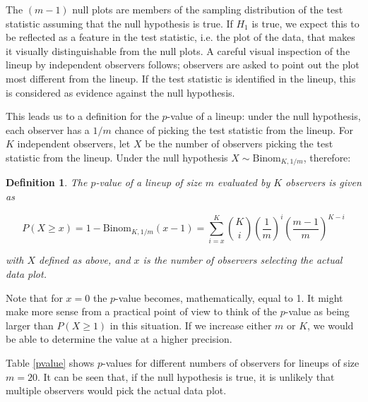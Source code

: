 \documentclass[12pt]{article}
\newtheorem{dfn}{Definition}[section]
\begin{document}
\noindent The $(m-1)$ null plots are %
members of the sampling distribution of the test statistic assuming that the null hypothesis is true. If $H_1$ is true, we expect this to be reflected as a feature in the test statistic, i.e. the plot of the data, that makes it visually distinguishable from the null plots. A careful visual inspection of the lineup by %
independent observers follows;  observers are asked to point out the plot most different from the lineup. If the test statistic is identified in the lineup, this is considered as evidence against the null hypothesis. 

This leads us to a definition for the $p$-value of a lineup: under the null hypothesis, each observer has a $1/m$ chance of picking the test statistic from the lineup.  For $K$ independent observers, let $X$ be  the number of observers picking the test statistic from the lineup. Under the null hypothesis $X \sim \text{Binom}_{K, 1/m}$,  therefore: 

\begin{dfn}\label{dfn:pvalue}
The $p$-value of a lineup of size $m$ evaluated by $K$ observers is  given as 

\begin{equation}\label{binom}
P(X \ge x) = 1 - \text{Binom}_{{K, 1/m}} (x-1) = \sum_{i=x}^{K} {K \choose i} \left(\frac{1}{m}\right)^{i} \left(\frac{m-1}{m}\right)^{K-i}
\end{equation}

\noindent with $X$ defined as above, and $x$ is the number of observers selecting the actual data plot. 
\end{dfn}
\noindent Note that for $x=0$ the $p$-value becomes, mathematically, equal to 1. It might make more sense from a practical point of view to think of the $p$-value as
being larger than $P(X \ge 1)$ in this situation. If we increase either $m$ or $K$, we would be able to determine the value at a higher precision.

Table \ref{pvalue} shows $p$-values for different numbers of observers for lineups of size $m = 20$. It can be seen that, if the null hypothesis is true, it is unlikely that multiple observers would pick the actual data plot.
\end{document}
